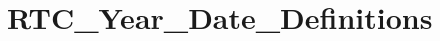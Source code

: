 \hypertarget{group___r_t_c___year___date___definitions}{\section{R\-T\-C\-\_\-\-Year\-\_\-\-Date\-\_\-\-Definitions}
\label{group___r_t_c___year___date___definitions}
}
